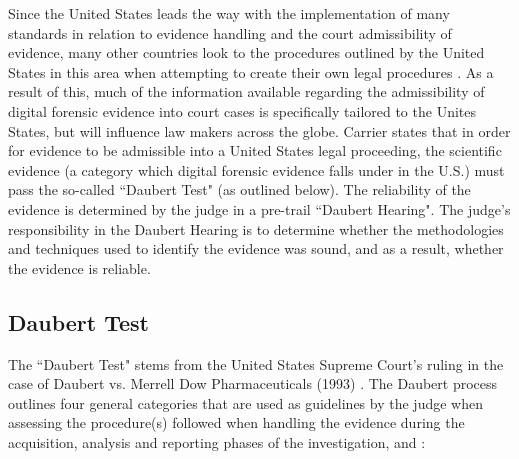 \documentclass[runningheads,a4paper]{llncs}
\begin{document}
Since the United States leads the way with the implementation of many standards in relation to evidence handling and the court admissibility of evidence, many other countries look to the procedures outlined by the United States in this area when attempting to create their own legal procedures \cite{commons}. As a result of this, much of the information available regarding the admissibility of digital forensic evidence into court cases is specifically tailored to the Unites States, but will influence law makers across the globe. Carrier \cite{carrier-open} states that in order for evidence to be admissible into a United States legal proceeding, the scientific evidence (a category which digital forensic evidence falls under in the U.S.) must pass the so-called ``Daubert Test" (as outlined below). The reliability of the evidence is determined by the judge in a pre-trail ``Daubert Hearing". The judge's responsibility in the Daubert Hearing is to determine whether the methodologies and techniques used to identify the evidence was sound, and as a result, whether the evidence is reliable.


\subsection{Daubert Test}
\label{ch2:daubert}


The ``Daubert Test" stems from the United States Supreme Court's ruling in the case of Daubert vs. Merrell Dow Pharmaceuticals (1993) \cite{daubert}. The Daubert process outlines four general categories that are used as guidelines by the judge when assessing the procedure(s) followed when handling the evidence during the acquisition, analysis and reporting phases of the investigation, \cite{carrier-open} and \cite{daubert}:
\end{document}
